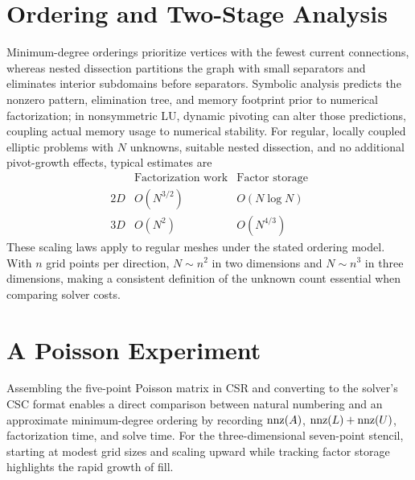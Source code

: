 \section{Ordering and Two-Stage Analysis}
Minimum-degree orderings prioritize vertices with the fewest current connections, whereas nested dissection partitions the graph with small separators and eliminates interior subdomains before separators. Symbolic analysis predicts the nonzero pattern, elimination tree, and memory footprint prior to numerical factorization; in nonsymmetric LU, dynamic pivoting can alter those predictions, coupling actual memory usage to numerical stability.
For regular, locally coupled elliptic problems with $N$ unknowns, suitable nested dissection, and no additional pivot-growth effects, typical estimates are
\[
\begin{array}{c|cc}
 &\text{Factorization work}&\text{Factor storage}\\\hline
2D&O(N^{3/2})&O(N\log N)\\
3D&O(N^2)&O(N^{4/3})
\end{array}
\]
These scaling laws apply to regular meshes under the stated ordering model. With $n$ grid points per direction, $N\sim n^2$ in two dimensions and $N\sim n^3$ in three dimensions, making a consistent definition of the unknown count essential when comparing solver costs.
\section{A Poisson Experiment}
Assembling the five-point Poisson matrix in CSR and converting to the solver's CSC format enables a direct comparison between natural numbering and an approximate minimum-degree ordering by recording $\operatorname{nnz}(A)$, $\operatorname{nnz}(L)+\operatorname{nnz}(U)$, factorization time, and solve time. For the three-dimensional seven-point stencil, starting at modest grid sizes and scaling upward while tracking factor storage highlights the rapid growth of fill.
